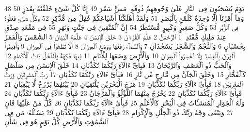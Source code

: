 {\tiny\colorbox{cl_aya}{48}} يَوْمَ يُسْحَبُونَ فِى ٱلنَّارِ عَلَىٰ وُجُوهِهِمْ ذُوقُوا۟ مَسَّ سَقَرَ
{\tiny\colorbox{cl_aya}{49}} إِنَّا كُلَّ شَىْءٍ خَلَقْنَٰهُ بِقَدَرٍ
{\tiny\colorbox{cl_aya}{50}} وَمَآ أَمْرُنَآ إِلَّا وَٰحِدَةٌ كَلَمْحٍۭ بِٱلْبَصَرِ
{\tiny\colorbox{cl_aya}{51}} وَلَقَدْ أَهْلَكْنَآ أَشْيَاعَكُمْ فَهَلْ مِن مُّدَّكِرٍ
{\tiny\colorbox{cl_aya}{52}} وَكُلُّ شَىْءٍ فَعَلُوهُ فِى ٱلزُّبُرِ
{\tiny\colorbox{cl_aya}{53}} وَكُلُّ صَغِيرٍ وَكَبِيرٍ مُّسْتَطَرٌ
{\tiny\colorbox{cl_aya}{54}} إِنَّ ٱلْمُتَّقِينَ فِى جَنَّٰتٍ وَنَهَرٍ
{\tiny\colorbox{cl_aya}{55}} فِى مَقْعَدِ صِدْقٍ عِندَ مَلِيكٍ مُّقْتَدِرٍۭ
{\tiny\colorbox{cl_aya}{1}} ٱلرَّحْمَٰنُ
{\tiny\colorbox{cl_aya}{2}} عَلَّمَ ٱلْقُرْءَانَ
{\tiny\colorbox{cl_aya}{3}} خَلَقَ ٱلْإِنسَٰنَ
{\tiny\colorbox{cl_aya}{4}} عَلَّمَهُ ٱلْبَيَانَ
{\tiny\colorbox{cl_aya}{5}} ٱلشَّمْسُ وَٱلْقَمَرُ بِحُسْبَانٍ
{\tiny\colorbox{cl_aya}{6}} وَٱلنَّجْمُ وَٱلشَّجَرُ يَسْجُدَانِ
{\tiny\colorbox{cl_aya}{7}} وَٱلسَّمَآءَ رَفَعَهَا وَوَضَعَ ٱلْمِيزَانَ
{\tiny\colorbox{cl_aya}{8}} أَلَّا تَطْغَوْا۟ فِى ٱلْمِيزَانِ
{\tiny\colorbox{cl_aya}{9}} وَأَقِيمُوا۟ ٱلْوَزْنَ بِٱلْقِسْطِ وَلَا تُخْسِرُوا۟ ٱلْمِيزَانَ
{\tiny\colorbox{cl_aya}{10}} وَٱلْأَرْضَ وَضَعَهَا لِلْأَنَامِ
{\tiny\colorbox{cl_aya}{11}} فِيهَا فَٰكِهَةٌ وَٱلنَّخْلُ ذَاتُ ٱلْأَكْمَامِ
{\tiny\colorbox{cl_aya}{12}} وَٱلْحَبُّ ذُو ٱلْعَصْفِ وَٱلرَّيْحَانُ
{\tiny\colorbox{cl_aya}{13}} فَبِأَىِّ ءَالَآءِ رَبِّكُمَا تُكَذِّبَانِ
{\tiny\colorbox{cl_aya}{14}} خَلَقَ ٱلْإِنسَٰنَ مِن صَلْصَٰلٍ كَٱلْفَخَّارِ
{\tiny\colorbox{cl_aya}{15}} وَخَلَقَ ٱلْجَآنَّ مِن مَّارِجٍ مِّن نَّارٍ
{\tiny\colorbox{cl_aya}{16}} فَبِأَىِّ ءَالَآءِ رَبِّكُمَا تُكَذِّبَانِ
{\tiny\colorbox{cl_aya}{17}} رَبُّ ٱلْمَشْرِقَيْنِ وَرَبُّ ٱلْمَغْرِبَيْنِ
{\tiny\colorbox{cl_aya}{18}} فَبِأَىِّ ءَالَآءِ رَبِّكُمَا تُكَذِّبَانِ
{\tiny\colorbox{cl_aya}{19}} مَرَجَ ٱلْبَحْرَيْنِ يَلْتَقِيَانِ
{\tiny\colorbox{cl_aya}{20}} بَيْنَهُمَا بَرْزَخٌ لَّا يَبْغِيَانِ
{\tiny\colorbox{cl_aya}{21}} فَبِأَىِّ ءَالَآءِ رَبِّكُمَا تُكَذِّبَانِ
{\tiny\colorbox{cl_aya}{22}} يَخْرُجُ مِنْهُمَا ٱللُّؤْلُؤُ وَٱلْمَرْجَانُ
{\tiny\colorbox{cl_aya}{23}} فَبِأَىِّ ءَالَآءِ رَبِّكُمَا تُكَذِّبَانِ
{\tiny\colorbox{cl_aya}{24}} وَلَهُ ٱلْجَوَارِ ٱلْمُنشَـَٔاتُ فِى ٱلْبَحْرِ كَٱلْأَعْلَٰمِ
{\tiny\colorbox{cl_aya}{25}} فَبِأَىِّ ءَالَآءِ رَبِّكُمَا تُكَذِّبَانِ
{\tiny\colorbox{cl_aya}{26}} كُلُّ مَنْ عَلَيْهَا فَانٍ
{\tiny\colorbox{cl_aya}{27}} وَيَبْقَىٰ وَجْهُ رَبِّكَ ذُو ٱلْجَلَٰلِ وَٱلْإِكْرَامِ
{\tiny\colorbox{cl_aya}{28}} فَبِأَىِّ ءَالَآءِ رَبِّكُمَا تُكَذِّبَانِ
{\tiny\colorbox{cl_aya}{29}} يَسْـَٔلُهُۥ مَن فِى ٱلسَّمَٰوَٰتِ وَٱلْأَرْضِ كُلَّ يَوْمٍ هُوَ فِى شَأْنٍ
